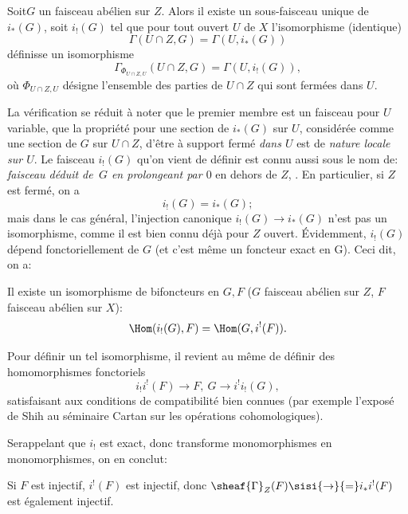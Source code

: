 \begin{proposition} \label{I.1.2}
Soit\pageoriginale $G$ un faisceau ab\'elien sur $Z$. Alors il existe un sous-faisceau unique de $i_*(G)$, soit $i_!(G)$ tel que pour tout ouvert $U$ de $X$ l'isomorphisme (identique)
$$
\Gamma(U\cap Z, G)= \Gamma(U, i_*(G))$$
d\'efinisse un isomorphisme
$$
\Gamma_{\Phi_{U\cap Z, U}}(U\cap Z, G)=\Gamma(U, i_! (G)),
$$
o\`u $\Phi_{U\cap Z, U}$ d\'esigne l'ensemble des parties de $U\cap Z$ qui sont ferm\'ees dans $U$.
\end{proposition}

La v\'erification se r\'eduit \`a noter que le premier membre est un faisceau pour $U$ variable, \ie que la propri\'et\'e pour une section de $i_*(G)$ sur $U$, consid\'er\'ee comme une section de $G$ sur $U\cap Z$, d'\^etre \`a support ferm\'e \textit{dans $U$} est de \textit{nature locale sur $U$}. Le faisceau $i_!(G)$ qu'on vient de d\'efinir est connu aussi sous le nom de: \textit{faisceau d\'eduit de~$G$ en prolongeant par $0$} en dehors de $Z$, \cf {}. En particulier, si $Z$ est ferm\'e, on a
\begin{equation} \label{eq:I.9} {i_!(G)=i_*(G)};
\end{equation}
mais dans le cas g\'en\'eral, l'injection canonique $i_!(G) \to i_*(G)$ n'est pas un isomorphisme, comme il est bien connu d\'ej\`a pour $Z$ ouvert. \'Evidemment, $i_!(G)$ d\'epend fonctoriellement de $G$ (et c'est m\^eme un foncteur exact en G). Ceci dit, on a:

\begin{proposition} \label{I.1.3} Il existe un isomorphisme de bifoncteurs en $G, F$ ($G$ faisceau ab\'elien sur $Z$, $F$ faisceau ab\'elien sur $X$):
\begin{equation} \label{eq:I.10} {\Hom(i_!(G), F) = \Hom (G, i^!(F))}.
\end{equation}
\end{proposition}

Pour d\'efinir un tel isomorphisme, il revient au m\^eme de d\'efinir des homomorphismes fonctoriels
$$i_!i^!(F) \to F, \ G \to i^!i_!(G),
$$
satisfaisant aux conditions de compatibilit\'e bien connues (\cf par exemple l'expos\'e de Shih au s\'eminaire Cartan sur les op\'erations cohomologiques).

Se\pageoriginaled rappelant que $i_!$ est exact, donc transforme monomorphismes en monomorphismes, on en conclut:

\begin{corollaire} \label{I.1.4}
Si $F$ est injectif, $i^!(F)$ est injectif, donc $\sheaf{\Gamma}_Z(F) \sisi{\to}{=} i_*i^!(F)$ est \'egalement injectif.
\end{corollaire}

